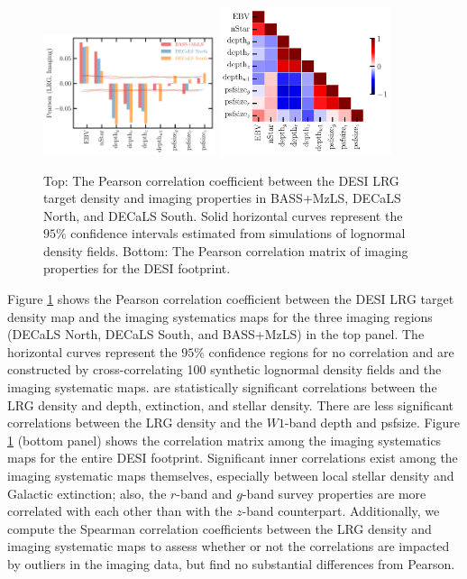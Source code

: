 \begin{figure}
\centering
 \includegraphics[width=0.45\textwidth]{figures/pcc.pdf} 
 \includegraphics[width=0.45\textwidth]{figures/pccx.pdf}  
 \caption{Top: The Pearson correlation coefficient between the DESI LRG target density and imaging properties in BASS+MzLS, DECaLS North, and DECaLS South. Solid horizontal curves represent the $95\%$ confidence intervals estimated from simulations of lognormal density fields. Bottom: The Pearson correlation matrix of imaging properties for the DESI footprint.}
 \label{fig:pcc}
\end{figure}

Figure \ref{fig:pcc} shows the Pearson correlation coefficient between the DESI LRG target density map and the imaging systematics maps for the three imaging regions (DECaLS North, DECaLS South, and BASS+MzLS) in the top panel. The horizontal curves represent the $95\%$ confidence regions for no correlation and are constructed by cross-correlating 100 synthetic lognormal density fields and the imaging systematic maps.  are statistically significant correlations between the LRG density and depth, extinction, and stellar density. There are less significant correlations between the LRG density and the $W1$-band depth and psfsize. Figure \ref{fig:pcc} (bottom panel) shows the correlation matrix among the imaging systematics maps for the entire DESI footprint. Significant inner correlations exist among the imaging systematic maps themselves, especially between local stellar density and Galactic extinction; also, the $r$-band and $g$-band survey properties are more correlated with each other than with the $z$-band counterpart. Additionally, we compute the Spearman correlation coefficients between the LRG density and imaging systematic maps to assess whether or not the correlations are impacted by outliers in the imaging data, but find no substantial differences from Pearson.

